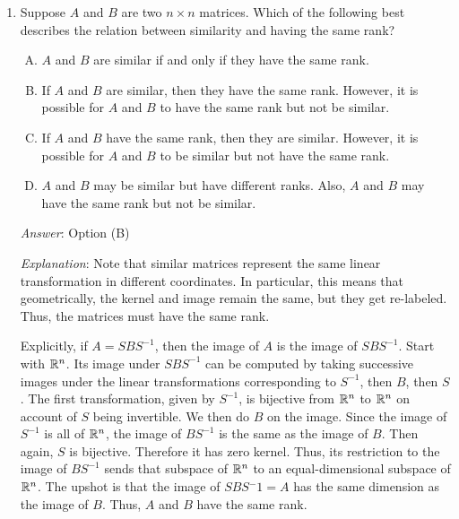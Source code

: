 \documentclass[10pt]{amsart}
\begin{document}
\begin{enumerate}
  {\em Answer}: Option (A)

  {\em Explanation}: We already proved that similar implies
  quasi-similar. We want to prove the reverse implication under the
  assumption that $A$ and $B$ are invertible. So, suppose $A = CD$ and
  $B = DC$ with $A$ and $B$ both invertible.

  First, note that $C$ is invertible. In fact, $C(DA^{-1})$ is the
  identity matrix.

  Now, note that:

  $$A = CD = CDCC^{-1} = C(DC)C^{-1} = CBC^{-1}$$

  Thus, $A$ and $B$ are similar.

  {\em Performance review}: 6 out of 23 people got this. 6 each chose
  (B) and (D), 5 chose (C).

  {\em Historical note (last time)}: $9$ out of $19$ got this. $7$ chose (B),
  $2$ chose (D), $1$ chose (C).

\item Suppose $A$ and $B$ are two $n \times n$ matrices. Which of the
  following best describes the relation between similarity and having
  the same rank?

  \begin{enumerate}[(A)]
  \item $A$ and $B$ are similar if and only if they have the same rank.
  \item If $A$ and $B$ are similar, then they have the same
    rank. However, it is possible for $A$ and $B$ to have the same
    rank but not be similar.
  \item If $A$ and $B$ have the same rank, then they are
    similar. However, it is possible for $A$ and $B$ to be similar but
    not have the same rank.
  \item $A$ and $B$ may be similar but have different ranks. Also, $A$
    and $B$ may have the same rank but not be similar.
  \end{enumerate}

  {\em Answer}: Option (B)

  {\em Explanation}: Note that similar matrices represent the same
  linear transformation in different coordinates. In particular, this
  means that geometrically, the kernel and image remain the same, but
  they get re-labeled. Thus, the matrices must have the same rank.

  Explicitly, if $A = SBS^{-1}$, then the image of $A$ is the image of
  $SBS^{-1}$. Start with $\mathbb{R}^n$. Its image under $SBS^{-1}$ can be
  computed by taking successive images under the linear
  transformations corresponding to $S^{-1}$, then $B$, then $S$. The
  first transformation, given by $S^{-1}$, is bijective from $\mathbb{R}^n$ to
  $\mathbb{R}^n$ on account of $S$ being invertible. We then do $B$ on the
  image. Since the image of $S^{-1}$ is all of $\mathbb{R}^n$, the image of
  $BS^{-1}$ is the same as the image of $B$. Then again, $S$ is
  bijective. Therefore it has zero kernel. Thus, its restriction to
  the image of $BS^{-1}$ sends that subspace of $\mathbb{R}^n$ to an
  equal-dimensional subspace of $\mathbb{R}^n$. The upshot is that the image
  of $SBS{^-1} = A$ has the same dimension as the image of $B$. Thus,
  $A$ and $B$ have the same rank.


\end{enumerate}
\end{document}
